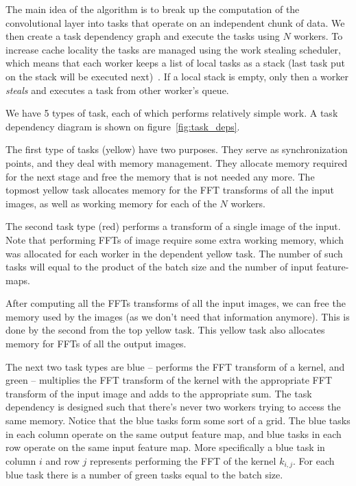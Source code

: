 \documentclass[conference]{IEEEtran}
\begin{document}
The main idea of the algorithm is to break up the computation of the
convolutional layer into tasks that operate on an independent chunk of
data.  We then create a task dependency graph and execute the tasks
using $N$ workers.  To increase cache locality the tasks are managed
using the work stealing scheduler, which means that each worker keeps
a list of local tasks as a stack (last task put on the stack will be
executed next)~\cite{reinders2007intel, willhalm2008putting}.  If a
local stack is empty, only then a worker \emph{steals} and executes a
task from other worker's queue.

We have 5 types of task, each of which performs relatively simple
work.  A task dependency diagram is shown on
figure~\ref{fig:task_deps}.

The first type of tasks (yellow) have two purposes.  They serve as
synchronization points, and they deal with memory management.  They
allocate memory required for the next stage and free the memory that
is not needed any more.  The topmost yellow task allocates memory for
the FFT transforms of all the input images, as well as working memory
for each of the $N$ workers.

The second task type (red) performs a transform of a single image of
the input.  Note that performing FFTs of image require some extra
working memory, which was allocated for each worker in the dependent
yellow task.  The number of such tasks will equal to the product of
the batch size and the number of input feature-maps.

After computing all the FFTs transforms of all the input images, we
can free the memory used by the images (as we don't need that
information anymore).  This is done by the second from the top yellow
task.  This yellow task also allocates memory for FFTs of all the
output images.

The next two task types are blue -- performs the FFT transform of a
kernel, and green -- multiplies the FFT transform of the kernel with
the appropriate FFT transform of the input image and adds to the
appropriate sum.  The task dependency is designed such that there's
never two workers trying to access the same memory.  Notice that the
blue tasks form some sort of a grid.  The blue tasks in each column
operate on the same output feature map, and blue tasks in each row
operate on the same input feature map.  More specifically a blue task
in column $i$ and row $j$ represents performing the FFT of the kernel
$k_{i,j}$.  For each blue task there is a number of green tasks equal
to the batch size.
\end{document}
